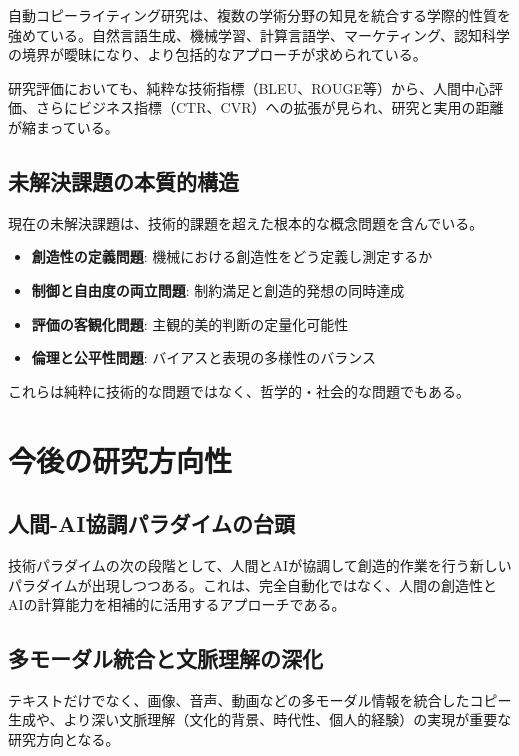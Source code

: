 \documentclass[11pt, a4paper]{article}
\begin{document}
自動コピーライティング研究は、複数の学術分野の知見を統合する学際的性質を強めている。自然言語生成、機械学習、計算言語学、マーケティング、認知科学の境界が曖昧になり、より包括的なアプローチが求められている。

研究評価においても、純粋な技術指標（BLEU、ROUGE等）から、人間中心評価、さらにビジネス指標（CTR、CVR）への拡張が見られ、研究と実用の距離が縮まっている。

\subsection{未解決課題の本質的構造}

現在の未解決課題は、技術的課題を超えた根本的な概念問題を含んでいる。

\begin{itemize}[noitemsep,topsep=0pt]
    \item \textbf{創造性の定義問題}: 機械における創造性をどう定義し測定するか
    \item \textbf{制御と自由度の両立問題}: 制約満足と創造的発想の同時達成
    \item \textbf{評価の客観化問題}: 主観的美的判断の定量化可能性
    \item \textbf{倫理と公平性問題}: バイアスと表現の多様性のバランス
\end{itemize}

これらは純粋に技術的な問題ではなく、哲学的・社会的な問題でもある。

\section{今後の研究方向性}

\subsection{人間-AI協調パラダイムの台頭}

技術パラダイムの次の段階として、人間とAIが協調して創造的作業を行う新しいパラダイムが出現しつつある。これは、完全自動化ではなく、人間の創造性とAIの計算能力を相補的に活用するアプローチである。

\subsection{多モーダル統合と文脈理解の深化}

テキストだけでなく、画像、音声、動画などの多モーダル情報を統合したコピー生成や、より深い文脈理解（文化的背景、時代性、個人的経験）の実現が重要な研究方向となる。
\end{document}
